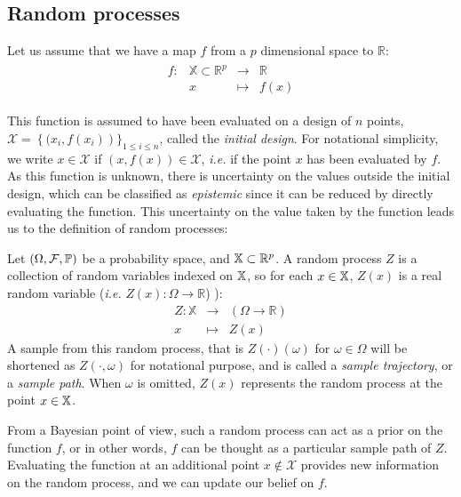 \documentclass[../../Main_ManuscritThese.tex]{subfiles}
\begin{document}
\subsection{Random processes}
Let us assume that we have a map $f$ from a $p$ dimensional space to $\mathbb{R}$:
\begin{align}
  \begin{array}{rrcl}
    f: & \mathbb{X} \subset \mathbb{R}^p& \longrightarrow & \mathbb{R} \\
       & x & \longmapsto & f(x)
  \end{array}
\end{align}

This function is assumed to have been evaluated on a design of $n$
points,
$\mathcal{X} = \left\{ (x_i, f(x_i) \right)\}_{1\leq i\leq n}$, called
the \emph{initial design}. For notational simplicity, we write
$x\in \mathcal{X}$ if $(x, f(x)) \in \mathcal{X}$, \textit{i.e.} if
the point $x$ has been evaluated by $f$.  As this function is unknown,
there is uncertainty on the values outside the initial design, which
can be classified as \emph{epistemic} since it can be reduced by
directly evaluating the function.  This uncertainty on the value taken
by the function leads us to the definition of random processes:
\begin{definition}
  Let $(\Omega, \mathcal{F}, \mathbb{P})$ be a probability space, and
  $\mathbb{X}\subset \mathbb{R}^p$.  A random process $Z$ is a collection
  of random variables indexed on $\mathbb{X}$, so for each
  $x \in \mathbb{X}$, $Z(x)$ is a real random variable (\textit{i.e.} $Z(x):\Omega \rightarrow \mathbb{R}$)%
  ):
 \begin{equation}
  \begin{array}{rcl}
    Z: \mathbb{X} & \longrightarrow & \left(\Omega \rightarrow \mathbb{R} \right)\\
    x& \longmapsto & Z(x)
  \end{array}
\end{equation}
A sample from this random process, that is $Z(\cdot)(\omega)$ for
$\omega \in \Omega$ will be shortened as $Z(\cdot, \omega)$ for
notational purpose, and is called a \emph{sample trajectory}, or a
\emph{sample path}.  When $\omega$ is omitted, $Z(x)$ represents the
random process at the point $x \in \mathbb{X}$.
\end{definition}
From a Bayesian point of view, such a random process can act as a
prior on the function $f$, or in other words, $f$ can be thought as a
particular sample path of $Z$.  Evaluating the function at an
additional point $x \notin \mathcal{X}$ provides new information on
the random process, and we can update our belief on $f$.
\end{document}
